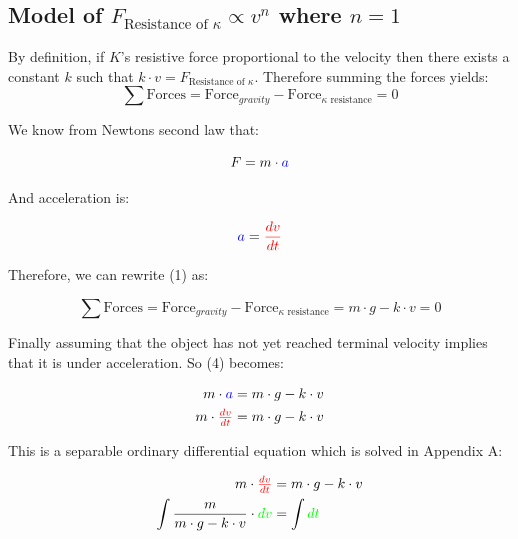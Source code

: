 \subsection{Model of $F_{\text{Resistance of }\kappa} \propto v^{n}$ where $n = 1$}
By definition, if $K$'s resistive force proportional to the velocity then there exists a constant $k$ such that $k \cdot v = F_{\text{Resistance of }\kappa}$. Therefore summing the forces yields:\\

\begin{equation}
\sum \text{Forces} = \text{Force}_{gravity} -  \text{Force}_{\kappa \text{ resistance}}= 0
\end{equation}

We know from Newtons second law that:

\begin{equation}
F = m \cdot \color{blue}a	\color{black}
\end{equation}

And acceleration is:

\begin{equation}
\color{blue}a\color{black} = \color{red}\dfrac{dv}{dt}\color{black}
\end{equation}

Therefore, we can rewrite (1) as:

\begin{equation}
\sum \text{Forces} = \text{Force}_{gravity} -  \text{Force}_{\kappa \text{ resistance}}= m \cdot g - k \cdot v = 0
\end{equation}
 
Finally assuming that the object has not yet reached terminal velocity implies that it is under acceleration. So (4) becomes:

\begin{equation}
\begin{align}
			m \cdot \color{blue}a\color{black} &= m \cdot g - k \cdot v\\
m\cdot \color{red}\tfrac{dv}{dt}\color{black} &= m \cdot g - k \cdot v
\end{align}
\end{equation}

This is a separable ordinary differential equation which is solved in Appendix A:

\begin{equation}
\begin{align}
					m\cdot\color{red}\tfrac{dv}{dt}\color{black} &= m \cdot g - k \cdot v\\				
\int\dfrac{m}{m \cdot g - k \cdot v}\cdot \color{green}dv\color{black} &= \int \color{green}dt\color{black}\\
\end{align}
\end{equation}

